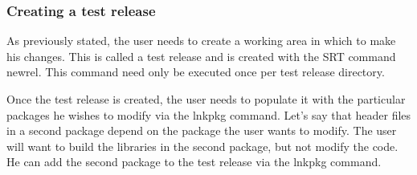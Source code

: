 \documentclass[12pt]{article}
\begin{document}
\subsubsection{Creating a test release}
\label{sec_testrel}

As previously stated, the user needs to create a working area in which
to make his changes. This is called a test release and is created with
the SRT command newrel.  This command need only be executed once per
test release directory. 

Once the test release is created, the user needs to populate it 
with the particular packages he wishes to modify via the lnkpkg command. 
Let's say that header files in a second package depend on the package the
user wants to modify. The user will want to build the libraries in 
the second package, but not modify the code. He can add the second package
to the test release via the lnkpkg command. 
\end{document}

